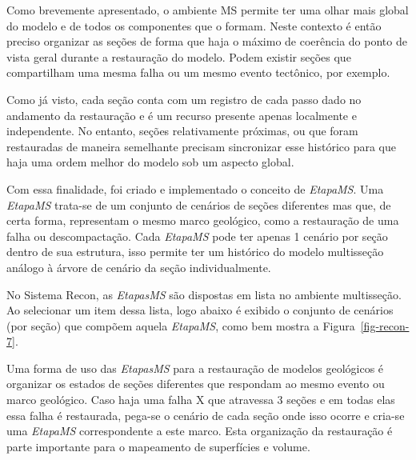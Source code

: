 Como brevemente apresentado, o ambiente MS permite ter uma olhar mais global do modelo e de todos os componentes que o formam. Neste contexto é então preciso organizar as seções de forma que haja o máximo de coerência do ponto de vista geral durante a restauração do modelo. Podem existir seções que compartilham uma mesma falha ou um mesmo evento tectônico, por exemplo.

Como já visto, cada seção conta com um registro de cada passo dado no andamento da restauração e é um recurso presente apenas localmente e independente. No entanto, seções relativamente próximas, ou que foram restauradas de maneira semelhante precisam sincronizar esse histórico para que haja uma ordem melhor do modelo sob um aspecto global.

Com essa finalidade, foi criado e implementado o conceito de \textit{EtapaMS}. Uma \textit{EtapaMS} trata-se de um conjunto de cenários de seções diferentes mas que, de certa forma, representam o mesmo marco geológico, como a restauração de uma falha ou descompactação. Cada \textit{EtapaMS} pode ter apenas 1 cenário por seção dentro de sua estrutura, isso permite ter um histórico do modelo multisseção análogo à árvore de cenário da seção individualmente.

No Sistema Recon, as \textit{EtapasMS} são dispostas em lista no ambiente multisseção. Ao selecionar um item dessa lista, logo abaixo é exibido o conjunto de cenários (por seção) que compõem aquela \textit{EtapaMS}, como bem mostra a Figura~\ref{fig-recon-7}.

Uma forma de uso das \textit{EtapasMS} para a restauração de modelos geológicos é organizar os estados de seções diferentes que respondam ao mesmo evento ou marco geológico. Caso haja uma falha X que atravessa 3 seções e em todas elas essa falha é restaurada, pega-se o cenário de cada seção onde isso ocorre e cria-se uma \textit{EtapaMS} correspondente a este marco. Esta organização da restauração é parte importante para o mapeamento de superfícies e volume.


